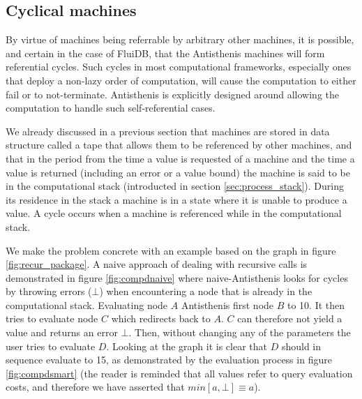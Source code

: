 \subsection{Cyclical machines}
\label{sec:cyclical_machines}

By virtue of machines being referrable by arbitrary other machines, it
is possible, and certain in the case of FluiDB, that the Antisthenis
machines will form referential cycles. Such cycles in most
computational frameworks, especially ones that deploy a non-lazy order
of computation, will cause the computation to either fail or to
not-terminate. Antisthenis is explicitly designed around allowing the
computation to handle such self-referential cases.

We already discussed in a previous section that machines are stored in
data structure called a tape that allows them to be referenced by
other machines, and that in the period from the time a value is
requested of a machine and the time a value is returned (including an
error or a value bound) the machine is said to be in the computational
stack (introducted in section \ref{sec:process_stack}). During its
residence in the stack a machine is in a state where it is unable to
produce a value. A cycle occurs when a machine is referenced while in
the computational stack.

We make the problem concrete with an example based on the graph in
figure \ref{fig:recur_package}. A naive approach of dealing with
recursive calls is demonstrated in figure
\ref{fig:compdnaive} where naive-Antisthenis looks
for cycles by throwing errors (\(\bot\)) when encountering a node that
is already in the computational stack. Evaluating node \(A\)
Antisthenis first node \(B\) to 10. It then tries to evaluate node
\(C\) which redirects back to \(A\). \(C\) can therefore not yield a
value and returns an error \(\bot\). Then, without changing any of the
parameters the user tries to evaluate \(D\). Looking at the graph it
is clear that \(D\) should in sequence evaluate to 15, as demonstrated
by the evaluation process in figure \ref{fig:compdsmart} (the reader
is reminded that all values refer to query evaluation costs, and
therefore we have asserted that \(min[a,\bot] \equiv a\)).


